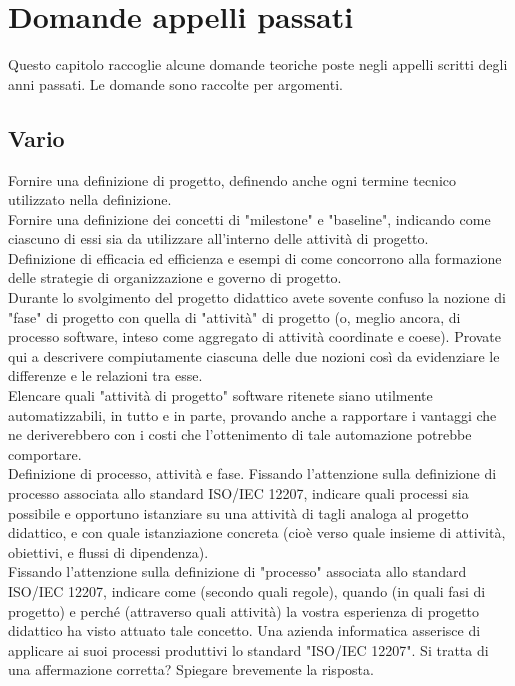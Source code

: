 \chapter{Domande appelli passati}

Questo capitolo raccoglie alcune domande teoriche poste negli appelli scritti degli anni passati.
Le domande sono raccolte per argomenti.

\section{Vario}

Fornire una definizione di progetto, definendo anche ogni termine tecnico utilizzato nella definizione.\\

Fornire una definizione dei concetti di "milestone" e "baseline", indicando come ciascuno di essi sia da utilizzare all'interno delle attività di progetto.\\

Definizione di efficacia ed efficienza e esempi di come concorrono alla formazione delle strategie di organizzazione e governo di progetto.\\

Durante lo svolgimento del progetto didattico avete sovente confuso la nozione di "fase" di progetto con quella di "attività" di progetto (o, meglio ancora, di processo software, inteso come aggregato di attività coordinate e coese).
Provate qui a descrivere compiutamente ciascuna delle due nozioni così da evidenziare le differenze e le relazioni tra esse.\\

Elencare quali "attività di progetto" software ritenete siano utilmente automatizzabili, in tutto e in parte, provando anche a rapportare i vantaggi che ne deriverebbero con i costi che l'ottenimento di tale automazione potrebbe comportare.\\


Definizione di processo, attività e fase.
Fissando l'attenzione sulla definizione di processo associata allo standard ISO/IEC 12207, indicare quali processi sia possibile e opportuno istanziare su una attività di tagli analoga al progetto didattico, e con quale istanziazione concreta (cioè verso quale insieme di attività, obiettivi, e flussi di dipendenza).\\

Fissando l'attenzione sulla definizione di "processo" associata allo standard ISO/IEC 12207, indicare come (secondo quali regole), quando (in quali fasi di progetto) e perché (attraverso quali attività) la vostra esperienza di progetto didattico ha visto attuato tale concetto. 
Una azienda informatica asserisce di applicare ai suoi processi produttivi lo standard "ISO/IEC 12207". Si tratta di una affermazione corretta? Spiegare brevemente la risposta.\\

